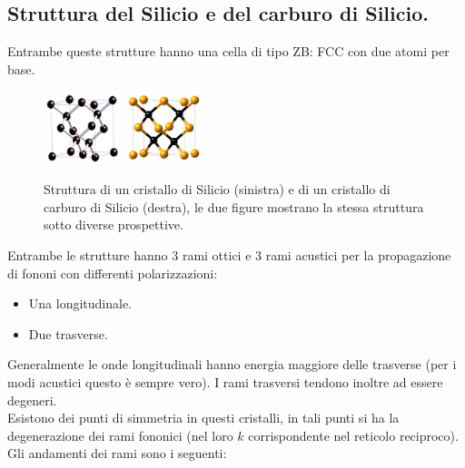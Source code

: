 \subsection{Struttura del Silicio e del carburo di Silicio.}%
\label{sub:Struttura del Silicio e del carburo di Silicio.}
Entrambe queste strutture hanno una cella di tipo ZB: FCC con due atomi per base. 
\begin{figure}[ht]
    \centering
    \includegraphics[width=0.2\textwidth]{figures/Si-struttura.png}
    \includegraphics[width=0.2\textwidth]{figures/SiC-struttura.png}
    \caption{Struttura di un cristallo di Silicio (sinistra) e di un cristallo di carburo di Silicio (destra), le due figure mostrano la stessa struttura sotto diverse prospettive.}
    \label{fig:-figures-SIC-SI-struttura}
\end{figure}
Entrambe le strutture hanno 3 rami ottici e 3 rami acustici per la propagazione di fononi con differenti polarizzazioni:
\begin{itemize}
    \item Una longitudinale.
    \item Due trasverse.
\end{itemize}
Generalmente le onde longitudinali hanno energia maggiore delle trasverse (per i modi acustici questo è sempre vero). I rami trasversi tendono inoltre ad essere degeneri.\\
Esistono dei punti di simmetria in questi cristalli, in tali punti si ha la degenerazione dei rami fononici (nel loro $k$ corrispondente nel reticolo reciproco). Gli andamenti dei rami sono i seguenti:
